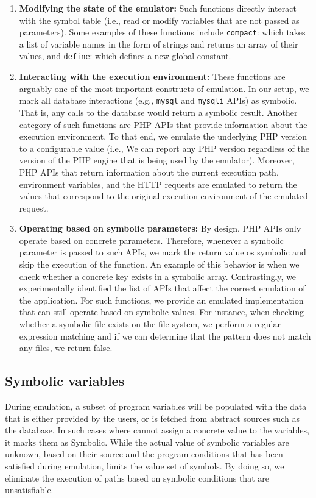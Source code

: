 \begin{enumerate}
    \item \textbf{Modifying the state of the emulator:} Such functions directly interact with the symbol table (i.e., read or modify variables that are not passed as parameters). Some examples of these functions include \texttt{compact}: which takes a list of variable names in the form of strings and returns an array of their values, and \texttt{define}: which defines a new global constant. 
    \item \textbf{Interacting with the execution environment:} These functions are arguably one of the most important constructs of emulation. In our setup, we mark all database interactions (e.g., \texttt{mysql} and \texttt{mysqli} APIs) as symbolic. That is, any calls to the database would return a symbolic result. Another category of such functions are PHP APIs that provide information about the execution environment. To that end, we emulate the underlying PHP version to a configurable value (i.e., We can report any PHP version regardless of the version of the PHP engine that is being used by the emulator). Moreover, PHP APIs that return information about the current execution path, environment variables, and the HTTP requests are emulated to return the values that correspond to the original execution environment of the emulated request. 
    \item \textbf{Operating based on symbolic parameters:} By design, PHP APIs only operate based on concrete parameters. Therefore, whenever a symbolic parameter is passed to such APIs, we mark the return value os symbolic and skip the execution of the function. An example of this behavior is when we check whether a concrete key exists in a symbolic array. Contrastingly, we experimentally identified the list of APIs that affect the correct emulation of the application. For such functions, we provide an emulated implementation that can still operate based on symbolic values. For instance, when checking whether a symbolic file exists on the file system, we perform a regular expression matching and if we can determine that the pattern does not match any files, we return false. 
\end{enumerate}


\subsection{Symbolic variables}

During emulation, a subset of program variables will be populated with the data that is either provided by the users, or is fetched from abstract sources such as the database. 
In such cases where \sys{} cannot assign a concrete value to the variables, it marks them as Symbolic. 
While the actual value of symbolic variables are unknown, based on their source and the program conditions that has been satisfied during emulation, \sys{} limits the value set of symbols. 
By doing so, we eliminate the execution of paths based on symbolic conditions that are unsatisfiable.

